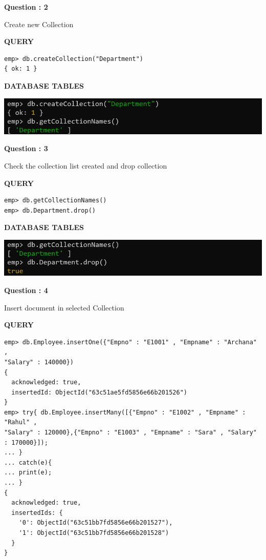 \documentclass[a4paper,12pt]{report}
\begin{document}
\begin{flushleft}
    \textbf{Question : 2}
\end{flushleft}
Create new Collection
\begin{flushleft}
\textbf{QUERY }
\end{flushleft}
 \begin{verbatim}
emp> db.createCollection("Department")
{ ok: 1 }
\end{verbatim}
\begin{flushleft}
\textbf{DATABASE TABLES}
\end{flushleft}
\includegraphics[scale=0.5]{create&getM.png}
\begin{flushleft}
    \textbf{Question : 3}
\end{flushleft}
Check the collection list created and drop collection
\begin{flushleft}
\textbf{QUERY }
\end{flushleft}
 \begin{verbatim}
emp> db.getCollectionNames()
emp> db.Department.drop()
\end{verbatim}
\newpage
\begin{flushleft}
\textbf{DATABASE TABLES}
\end{flushleft}
\includegraphics[scale=0.5]{M3.png}
\begin{flushleft}
    \textbf{Question : 4}
\end{flushleft}
Insert document in selected Collection
\begin{flushleft}
\textbf{QUERY }
\end{flushleft}
 \begin{verbatim}
emp> db.Employee.insertOne({"Empno" : "E1001" , "Empname" : "Archana" ,
"Salary" : 140000})
{
  acknowledged: true,
  insertedId: ObjectId("63c51ae5fd5856e66b201526")
}
emp> try{ db.Employee.insertMany([{"Empno" : "E1002" , "Empname" : "Rahul" ,
"Salary" : 120000},{"Empno" : "E1003" , "Empname" : "Sara" , "Salary" : 170000}]);
... }
... catch(e){
... print(e);
... }
{
  acknowledged: true,
  insertedIds: {
    '0': ObjectId("63c51bb7fd5856e66b201527"),
    '1': ObjectId("63c51bb7fd5856e66b201528")
  }
}
\end{verbatim}
\end{document}
